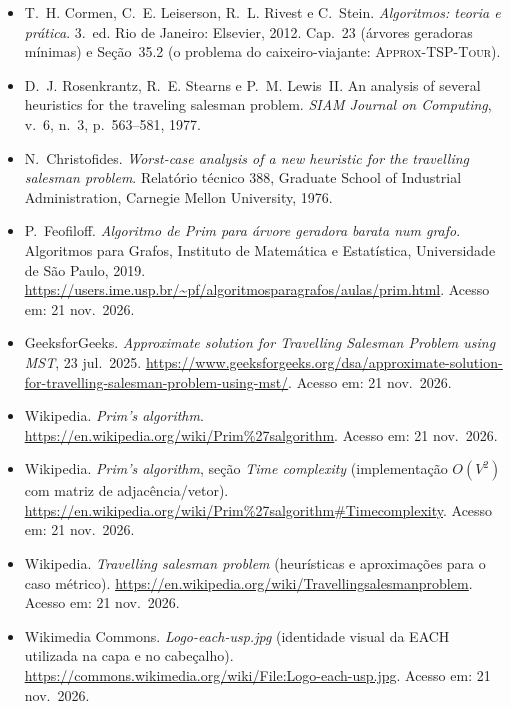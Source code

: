 \documentclass[11pt,a4paper]{article}
\newcommand{\segurl}[1]{\underline{\vphantom{Ag}#1}\hspace{0pt}}
\newcommand{\urlPrimFeofiloff}{\href{https://users.ime.usp.br/~pf/algoritmos_para_grafos/aulas/prim.html}{\ttfamily\color{linkblue}\segurl{https://users.ime.usp.br/}\allowbreak\segurl{\textasciitilde pf/}\allowbreak\segurl{algoritmos\_para\_grafos/}\allowbreak\segurl{aulas/}\allowbreak\segurl{prim.html}}}
\newcommand{\urlGeeks}{\href{https://www.geeksforgeeks.org/dsa/approximate-solution-for-travelling-salesman-problem-using-mst/}{\ttfamily\color{linkblue}\segurl{https://www.geeksforgeeks.org/}\allowbreak\segurl{dsa/}\allowbreak\segurl{approximate-}\allowbreak\segurl{solution-}\allowbreak\segurl{for-}\allowbreak\segurl{travelling-}\allowbreak\segurl{salesman-}\allowbreak\segurl{problem-}\allowbreak\segurl{using-}\allowbreak\segurl{mst/}}}
\newcommand{\urlWikiPrim}{\href{https://en.wikipedia.org/wiki/Prim\%27s_algorithm}{\ttfamily\color{linkblue}\segurl{https://en.wikipedia.org/}\allowbreak\segurl{wiki/}\allowbreak\segurl{Prim\%27s\_algorithm}}}
\newcommand{\urlWikiPrimTempo}{\href{https://en.wikipedia.org/wiki/Prim\%27s_algorithm\#Time_complexity}{\ttfamily\color{linkblue}\segurl{https://en.wikipedia.org/}\allowbreak\segurl{wiki/}\allowbreak\segurl{Prim\%27s\_algorithm\#}\allowbreak\segurl{Time\_complexity}}}
\newcommand{\urlWikiTSP}{\href{https://en.wikipedia.org/wiki/Travelling_salesman_problem}{\ttfamily\color{linkblue}\segurl{https://en.wikipedia.org/}\allowbreak\segurl{wiki/}\allowbreak\segurl{Travelling\_salesman\_problem}}}
\newcommand{\urlLogoEACH}{\href{https://commons.wikimedia.org/wiki/File:Logo-each-usp.jpg}{\ttfamily\color{linkblue}\segurl{https://commons.wikimedia.org/}\allowbreak\segurl{wiki/}\allowbreak\segurl{File:Logo-each-usp.jpg}}}
\renewcommand{\_}{\underscoreoriginal\allowbreak}
\begin{document}
\begin{itemize}
  \item T.~H. Cormen, C.~E. Leiserson, R.~L. Rivest e C.~Stein.
    \emph{Algoritmos: teoria e prática}. 3.~ed. Rio de Janeiro:
    Elsevier, 2012. Cap.~23 (árvores geradoras mínimas) e Seção~35.2
    (o problema do caixeiro-viajante: \textsc{Approx-TSP-Tour}).
  \item D.~J. Rosenkrantz, R.~E. Stearns e P.~M. Lewis~II. An analysis
    of several heuristics for the traveling salesman problem.
    \emph{SIAM Journal on Computing}, v.~6, n.~3, p.~563--581, 1977.
  \item N.~Christofides. \emph{Worst-case analysis of a new heuristic
    for the travelling salesman problem}. Relatório técnico 388,
    Graduate School of Industrial Administration, Carnegie Mellon
    University, 1976.
  \item P.~Feofiloff. \emph{Algoritmo de Prim para árvore geradora
    barata num grafo}. Algoritmos para Grafos, Instituto de Matemática e
    Estatística, Universidade de São Paulo, 2019. \urlPrimFeofiloff.
    Acesso em: 21 nov.\ 2026.
  \item GeeksforGeeks. \emph{Approximate solution for Travelling
    Salesman Problem using MST}, 23 jul.\ 2025. \urlGeeks. Acesso em:
    21 nov.\ 2026.
  \item Wikipedia. \emph{Prim's algorithm}. \urlWikiPrim. Acesso em:
    21 nov.\ 2026.
  \item Wikipedia. \emph{Prim's algorithm}, seção \emph{Time complexity}
    (implementação $O(V^2)$ com matriz de adjacência/vetor).
    \urlWikiPrimTempo. Acesso em: 21 nov.\ 2026.
  \item Wikipedia. \emph{Travelling salesman problem} (heurísticas e
    aproximações para o caso métrico). \urlWikiTSP. Acesso em:
    21 nov.\ 2026.
  \item Wikimedia Commons. \emph{Logo-each-usp.jpg} (identidade visual
    da EACH utilizada na capa e no cabeçalho). \urlLogoEACH. Acesso em:
    21 nov.\ 2026.
\end{itemize}
\end{document}
